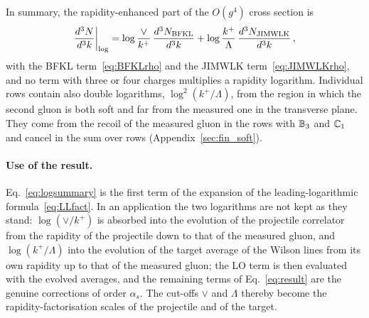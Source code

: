 In summary, the rapidity-enhanced part of the $O(g^4)$ cross section is
\begin{align}\label{eq:logsummary}
\frac{d^3N}{d^3k}\bigg|_{\log}=\log\frac{\vee}{k^+}\,\frac{d^3N_{\rm BFKL}}{d^3k}+\log\frac{k^+}{\Lambda}\,\frac{d^3N_{\rm JIMWLK}}{d^3k}\,,
\end{align}
with the BFKL term~\eqref{eq:BFKLrho} and the JIMWLK term~\eqref{eq:JIMWLKrho}, and no term with three or four charges multiplies a rapidity logarithm. Individual rows contain also double logarithms, $\log^2(k^+/\Lambda)$, from the region in which the second gluon is both soft and far from the measured one in the transverse plane. They come from the recoil of the measured gluon in the rows with $\mathbb{B}_3$ and $\mathbb{C}_1$ and cancel in the sum over rows (Appendix~\ref{sec:fin_soft}).

\paragraph{Use of the result.} Eq.~\eqref{eq:logsummary} is the first term of the expansion of the leading-logarithmic formula~\eqref{eq:LLfact}. In an application the two logarithms are not kept as they stand: $\log(\vee/k^+)$ is absorbed into the evolution of the projectile correlator from the rapidity of the projectile down to that of the measured gluon, and $\log(k^+/\Lambda)$ into the evolution of the target average of the Wilson lines from its own rapidity up to that of the measured gluon; the LO term is then evaluated with the evolved averages, and the remaining terms of Eq.~\eqref{eq:result} are the genuine corrections of order $\alpha_s$. The cut-offs $\vee$ and $\Lambda$ thereby become the rapidity-factorisation scales of the projectile and of the target.

